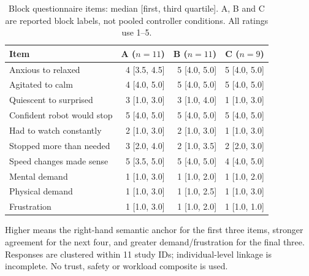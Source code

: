 \begin{table}[t]
\centering
\caption{Block questionnaire items: median [first, third quartile]. A, B and C are reported block labels, not pooled controller conditions. All ratings use 1--5.}
\label{tab:survey}
\footnotesize
\begin{tabular}{lrrr}
\toprule
Item & A ($n=11$) & B ($n=11$) & C ($n=9$) \\
\midrule
Anxious to relaxed & 4 [3.5, 4.5] & 5 [4.0, 5.0] & 5 [4.0, 5.0] \\
Agitated to calm & 4 [4.0, 5.0] & 5 [4.0, 5.0] & 5 [4.0, 5.0] \\
Quiescent to surprised & 3 [1.0, 3.0] & 3 [1.0, 4.0] & 1 [1.0, 3.0] \\
Confident robot would stop & 5 [4.0, 5.0] & 5 [4.0, 5.0] & 5 [4.0, 5.0] \\
Had to watch constantly & 2 [1.0, 3.0] & 2 [1.0, 3.0] & 1 [1.0, 3.0] \\
Stopped more than needed & 3 [2.0, 4.0] & 2 [1.0, 3.5] & 2 [2.0, 3.0] \\
Speed changes made sense & 5 [3.5, 5.0] & 5 [4.0, 5.0] & 4 [4.0, 5.0] \\
Mental demand & 1 [1.0, 3.0] & 1 [1.0, 2.0] & 1 [1.0, 2.0] \\
Physical demand & 1 [1.0, 3.0] & 1 [1.0, 2.5] & 1 [1.0, 3.0] \\
Frustration & 1 [1.0, 3.0] & 1 [1.0, 2.0] & 1 [1.0, 1.0] \\
\bottomrule
\end{tabular}
\par\smallskip\begin{minipage}{\linewidth}\footnotesize Higher means the right-hand semantic anchor for the first three items, stronger agreement for the next four, and greater demand/frustration for the final three. Responses are clustered within 11 study IDs; individual-level linkage is incomplete. No trust, safety or workload composite is used.\end{minipage}
\end{table}
